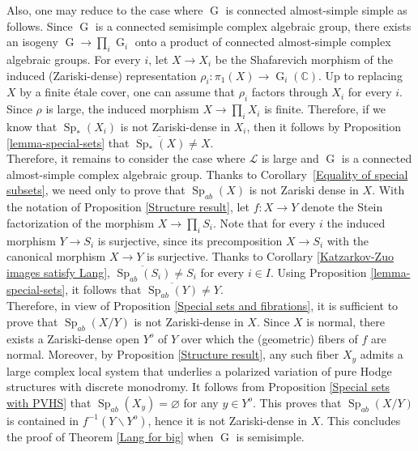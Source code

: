 \documentclass[11pt,letterpaper]{amsart}
\def\bC{\mathbb{C}}
\def\cL{\mathcal{L}}
\theoremstyle{plain}
\DeclareMathOperator{\Sp}{Sp}
\DeclareMathOperator{\rG}{G}
\begin{document}
Also, one may reduce to the case where $\rG$ is connected almost-simple simple as follows. Since $\rG$ is a connected semisimple complex algebraic group, there exists an isogeny $\rG \to \prod_i \rG_i$ onto a product of connected almost-simple complex algebraic groups. For every $i$, let $X \to X_i$ be the Shafarevich morphism of the induced (Zariski-dense) representation $\rho_i \colon \pi_1(X) \to \rG_i(\bC)$. Up to replacing $X$ by a finite étale cover, one can assume that $\rho_i$ factors through $X_i$ for every $i$. Since $\rho$ is large, the induced morphism $X \to \prod_i X_i$ is finite.
Therefore, if we know that $\Sp_{\ast}(X_i)$ is not Zariski-dense in $X_i$, then it follows by Proposition \ref{lemma-special-sets} that $\overline{\Sp_{\ast}(X)} \neq X$.\\

Therefore, it remains to consider the case where $\cL$ is large and $\rG$ is a connected almost-simple complex algebraic group. Thanks to Corollary~\ref{Equality of special subsets}, we need only to prove that $\Sp_{ab}(X)$ is not Zariski dense in $X$. With the notation of Proposition \ref{Structure result}, let $f\colon X \to Y$ denote the Stein factorization of the morphism $X \to \prod_i S_i$. Note that for every $i$ the induced morphism $Y \to S_i$ is surjective, since its precomposition $X \to S_i$ with the canonical morphism $X \to Y$ is surjective. Thanks to Corollary \ref{Katzarkov-Zuo images satisfy Lang}, $\overline{\Sp_{ab}(S_i)} \neq S_i$ for every $i \in I$. Using Proposition \ref{lemma-special-sets}, it follows that $\overline{\Sp_{ab}(Y)} \neq Y$. \\

Therefore, in view of Proposition \ref{Special sets and fibrations}, it is sufficient to prove that $\Sp_{ab}(X/Y)$ is not Zariski-dense in $X$. Since $X$ is normal, there exists a Zariski-dense open $Y^o$ of $Y$ over which the (geometric) fibers of $f$ are normal. Moreover, by Proposition \ref{Structure result}, any such fiber $X_y$ admits a large complex local system that underlies a polarized variation of pure Hodge structures with discrete monodromy. It follows from Proposition \ref{Special sets with PVHS} that $\Sp_{ab}(X_y) = \varnothing$ for any $y \in Y^o$. This proves that $\Sp_{ab}(X/Y)$ is contained in $f^{-1}(Y \backslash Y^o)$, hence it is not Zariski-dense in $X$. This concludes the proof of Theorem \ref{Lang for big} when $\rG$ is semisimple.


\end{document}
